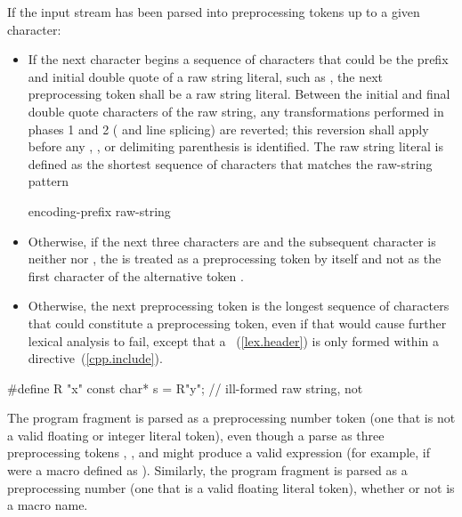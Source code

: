 \pnum
If the input stream has been parsed into preprocessing tokens up to a
given character:

\begin{itemize}
\item If the next character begins a sequence of characters that could be the prefix
and initial double quote of a raw string literal, such as , the next preprocessing
token shall be a raw string literal. Between the initial and final
double quote characters of the raw string, any transformations performed in phases
1 and 2 ( and line splicing) are reverted; this reversion
shall apply before any , , or delimiting
parenthesis is identified. The raw string literal is defined as the shortest sequence
of characters that matches the raw-string pattern

\begin{ncbnf}
encoding-prefix\opt{}  raw-string
\end{ncbnf}

\item Otherwise, if the next three characters are \tcode{<::} and the subsequent character
is neither \tcode{:} nor \tcode{>}, the \tcode{<} is treated as a preprocessing token by
itself and not as the first character of the alternative token \tcode{<:}.

\item Otherwise,
the next preprocessing token is the longest sequence of
characters that could constitute a preprocessing token, even if that
would cause further lexical analysis to fail,
except that a ~(\ref{lex.header}) is only formed
within a  directive~(\ref{cpp.include}).
\end{itemize}

\begin{example}
\begin{codeblock}
#define R "x"
const char* s = R"y";           // ill-formed raw string, not 
\end{codeblock}
\end{example}

\pnum
\begin{example} The program fragment  is parsed as a
preprocessing number token (one that is not a valid floating or integer
literal token), even though a parse as three preprocessing tokens
, \tcode{+}, and  might produce a valid expression (for example,
if  were a macro defined as ). Similarly, the
program fragment  is parsed as a preprocessing number (one
that is a valid floating literal token), whether or not  is a
macro name. \end{example}

